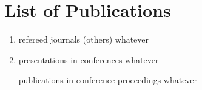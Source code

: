 \chapter*{List of Publications}
\thispagestyle{empty}
\begin{enumerate}
    \itemhrefereed journals based on thesis
        whatever \par
    \item refereed journals (others)
        whatever \par
    \item presentations in conferences
        whatever \par
    \itemhead publications in conference proceedings
        whatever \par
\end{enumerate}
\vfill
